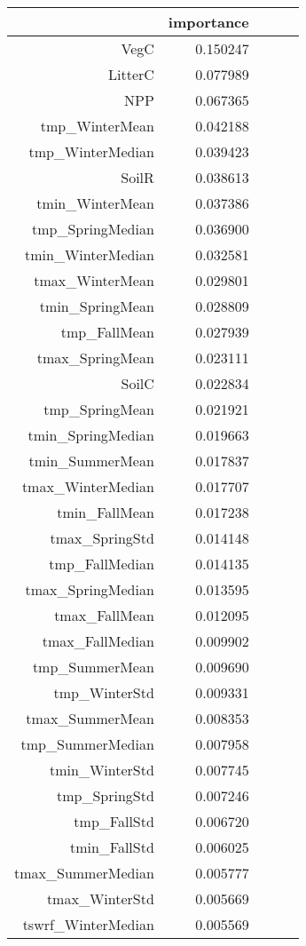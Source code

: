 \begin{table}[h]
\centering
\label{table:5}
\begin{tabular}{rrrrr}
\toprule
 & importance \\
\midrule
VegC & 0.150247 \\
LitterC & 0.077989 \\
NPP & 0.067365 \\
tmp_WinterMean & 0.042188 \\
tmp_WinterMedian & 0.039423 \\
SoilR & 0.038613 \\
tmin_WinterMean & 0.037386 \\
tmp_SpringMedian & 0.036900 \\
tmin_WinterMedian & 0.032581 \\
tmax_WinterMean & 0.029801 \\
tmin_SpringMean & 0.028809 \\
tmp_FallMean & 0.027939 \\
tmax_SpringMean & 0.023111 \\
SoilC & 0.022834 \\
tmp_SpringMean & 0.021921 \\
tmin_SpringMedian & 0.019663 \\
tmin_SummerMean & 0.017837 \\
tmax_WinterMedian & 0.017707 \\
tmin_FallMean & 0.017238 \\
tmax_SpringStd & 0.014148 \\
tmp_FallMedian & 0.014135 \\
tmax_SpringMedian & 0.013595 \\
tmax_FallMean & 0.012095 \\
tmax_FallMedian & 0.009902 \\
tmp_SummerMean & 0.009690 \\
tmp_WinterStd & 0.009331 \\
tmax_SummerMean & 0.008353 \\
tmp_SummerMedian & 0.007958 \\
tmin_WinterStd & 0.007745 \\
tmp_SpringStd & 0.007246 \\
tmp_FallStd & 0.006720 \\
tmin_FallStd & 0.006025 \\
tmax_SummerMedian & 0.005777 \\
tmax_WinterStd & 0.005669 \\
tswrf_WinterMedian & 0.005569 \\

\end{tabular}
\end{table}
